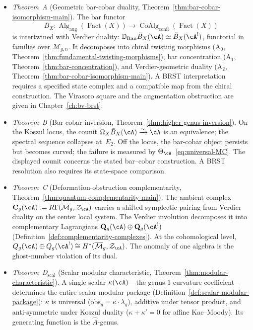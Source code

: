 \begin{itemize}
\item \emph{Theorem~A} (Geometric bar-cobar duality,
  Theorem~\ref{thm:bar-cobar-isomorphism-main}).
  The bar functor
  \[
  \bar{B}_X \colon
  \operatorname{Alg}_{\mathrm{aug}}(\operatorname{Fact}(X))
  \to \operatorname{CoAlg}_{\mathrm{conil}}(\operatorname{Fact}(X))
  \]
  is intertwined with Verdier duality:
  $\mathbb{D}_{\operatorname{Ran}} \bar{B}_X(\cA)
  \simeq \bar{B}_X(\cA^!)$,
  functorial in families over $\overline{\mathcal{M}}_{g,n}$.
  It decomposes into chiral twisting morphisms
  ($\mathrm{A}_0$,
  Theorem~\ref{thm:fundamental-twisting-morphisms}),
  bar concentration
  ($\mathrm{A}_1$, Theorem~\ref{thm:bar-concentration}), and
  Verdier-geometric duality
  ($\mathrm{A}_2$,
  Theorem~\ref{thm:bar-cobar-isomorphism-main}).
  A BRST interpretation requires a specified state complex and a compatible map from the chiral construction.
  The Virasoro square and the augmentation obstruction are given in Chapter~\ref{ch:bv-brst}.

\item \emph{Theorem~B} (Bar-cobar inversion,
  Theorem~\ref{thm:higher-genus-inversion}).
  On the Koszul locus, the counit
  $\Omega_X \bar{B}_X(\cA) \xrightarrow{\sim} \cA$
  is an equivalence; the spectral sequence collapses at~$E_2$.
  Off the locus, the bar-cobar object persists but becomes curved;
  the failure is measured by
  $\Theta_\cA$~\eqref{eq:universal-MC}.
  The displayed counit concerns the stated bar--cobar construction.
  A BRST resolution also requires its state-space comparison.

\item \emph{Theorem~C} (Deformation-obstruction complementarity,
  Theorem~\ref{thm:quantum-complementarity-main}).
  The ambient complex
  $\mathbf{C}_g(\cA) := R\Gamma(\overline{\mathcal{M}}_g,
  \mathcal{Z}_\cA)$
  carries a shifted-symplectic pairing from Verdier duality on
  the center local system.  The Verdier involution decomposes it
  into complementary Lagrangians
  $\mathbf{Q}_g(\cA) \oplus \mathbf{Q}_g(\cA^!)$
  (Definition~\ref{def:complementarity-complexes}).
  At the cohomological level,
  $Q_g(\cA) \oplus Q_g(\cA^!) \cong
  H^*(\overline{\mathcal{M}}_g, \mathcal{Z}_\cA)$.
  The anomaly of one algebra is the ghost-number violation of
  its dual.

\item \emph{Theorem~D$_{\mathrm{scal}}$} (Scalar modular
  characteristic, Theorem~\ref{thm:modular-characteristic}).
  A single scalar $\kappa(\cA)$---the genus-$1$ curvature
  coefficient---determines the entire scalar modular package
  (Definition~\ref{def:scalar-modular-package}):
  $\kappa$ is universal
  ($\mathrm{obs}_g = \kappa \cdot \lambda_g$),
  additive under tensor product, and anti-symmetric under
  Koszul duality ($\kappa + \kappa' = 0$ for affine Kac--Moody).
  Its generating function is the $\hat{A}$-genus.


\end{itemize}
